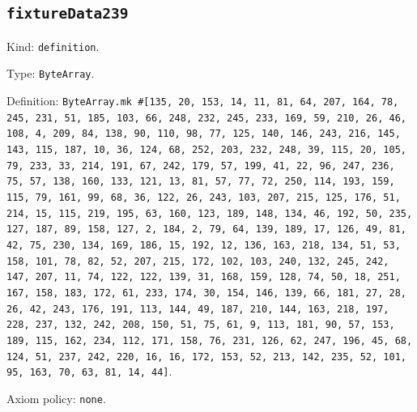 \documentclass[11pt]{article}
\begin{document}
\subsection*{\texttt{fixtureData239}}
\noindent Kind: \texttt{definition}.\par
\noindent Type: \texttt{ByteArray}.\par
\noindent Definition: \texttt{ByteArray.mk \#[135, 20, 153, 14, 11, 81, 64, 207, 164, 78, 245, 231, 51, 185, 103, 66, 248, 232, 245, 233, 169, 59, 210, 26, 46, 108, 4, 209, 84, 138, 90, 110, 98, 77, 125, 140, 146, 243, 216, 145, 143, 115, 187, 10, 36, 124, 68, 252, 203, 232, 248, 39, 115, 20, 105, 79, 233, 33, 214, 191, 67, 242, 179, 57, 199, 41, 22, 96, 247, 236, 75, 57, 138, 160, 133, 121, 13, 81, 57, 77, 72, 250, 114, 193, 159, 115, 79, 161, 99, 68, 36, 122, 26, 243, 103, 207, 215, 125, 176, 51, 214, 15, 115, 219, 195, 63, 160, 123, 189, 148, 134, 46, 192, 50, 235, 127, 187, 89, 158, 127, 2, 184, 2, 79, 64, 139, 189, 17, 126, 49, 81, 42, 75, 230, 134, 169, 186, 15, 192, 12, 136, 163, 218, 134, 51, 53, 158, 101, 78, 82, 52, 207, 215, 172, 102, 103, 240, 132, 245, 242, 147, 207, 11, 74, 122, 122, 139, 31, 168, 159, 128, 74, 50, 18, 251, 167, 158, 183, 172, 61, 233, 174, 30, 154, 146, 139, 66, 181, 27, 28, 26, 42, 243, 176, 191, 113, 144, 49, 187, 210, 144, 163, 218, 197, 228, 237, 132, 242, 208, 150, 51, 75, 61, 9, 113, 181, 90, 57, 153, 189, 115, 162, 234, 112, 171, 158, 76, 231, 126, 62, 247, 196, 45, 68, 124, 51, 237, 242, 220, 16, 16, 172, 153, 52, 213, 142, 235, 52, 101, 95, 163, 70, 63, 81, 14, 44]}.\par
\noindent Axiom policy: \texttt{none}.\par
\end{document}
